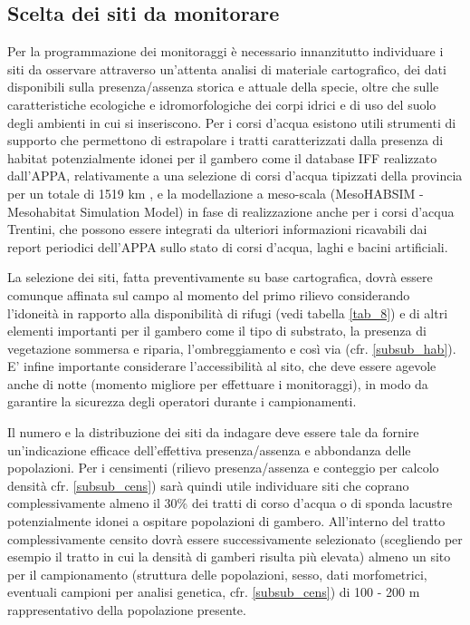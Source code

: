 \documentclass[11pt,a4paper,italian,twoside,openany]{memoir}
\begin{document}
\subsection{Scelta dei siti da monitorare} 
Per la programmazione dei monitoraggi è necessario innanzitutto individuare i siti da osservare attraverso un'attenta analisi di materiale cartografico, dei dati disponibili sulla presenza/assenza storica e attuale della specie, oltre che sulle caratteristiche ecologiche e idromorfologiche dei corpi idrici e di uso del suolo degli ambienti in cui si inseriscono. Per i corsi d'acqua esistono utili strumenti di supporto che permettono di estrapolare i tratti caratterizzati dalla presenza di habitat potenzialmente idonei per il gambero come il database IFF realizzato dall'APPA, relativamente a una selezione di corsi d'acqua tipizzati della provincia per un totale di 1519 km \cite{APPA 2013}, e la modellazione a meso-scala (MesoHABSIM - Mesohabitat Simulation Model) \cite{Parasiewicz 2007} \cite{Vezza 2014} in fase di realizzazione anche per i corsi d'acqua Trentini, che possono essere integrati da ulteriori informazioni ricavabili dai report periodici dell'APPA sullo stato di corsi d'acqua, laghi e bacini artificiali.

La selezione dei siti, fatta preventivamente su base cartografica, dovrà essere comunque affinata sul campo al momento del primo rilievo considerando l'idoneità in rapporto alla disponibilità di rifugi (vedi tabella \ref{tab_8}) e di altri elementi importanti per il gambero come il tipo di substrato, la presenza di vegetazione sommersa e riparia, l'ombreggiamento e così via (cfr. \ref{subsub_hab}). E' infine importante considerare l'accessibilità al sito, che deve essere agevole anche di notte (momento migliore per effettuare i monitoraggi), in modo da garantire la sicurezza degli operatori durante i campionamenti. 

Il numero e la distribuzione dei siti da indagare deve essere tale da fornire un'indicazione efficace dell'effettiva presenza/assenza e abbondanza delle popolazioni. Per i censimenti (rilievo presenza/assenza e conteggio per calcolo densità cfr. \ref{subsub_cens}) sarà quindi utile individuare siti che coprano complessivamente almeno il 30\% dei tratti di corso d'acqua o di sponda lacustre potenzialmente idonei a ospitare popolazioni di gambero. All'interno del tratto complessivamente censito dovrà essere successivamente selezionato (scegliendo per esempio il tratto in cui la densità di gamberi risulta più elevata) almeno un sito per il campionamento (struttura delle popolazioni, sesso, dati morfometrici, eventuali campioni per analisi genetica, cfr. \ref{subsub_cens}) di 100 - 200 m rappresentativo della popolazione presente.  
\end{document}
